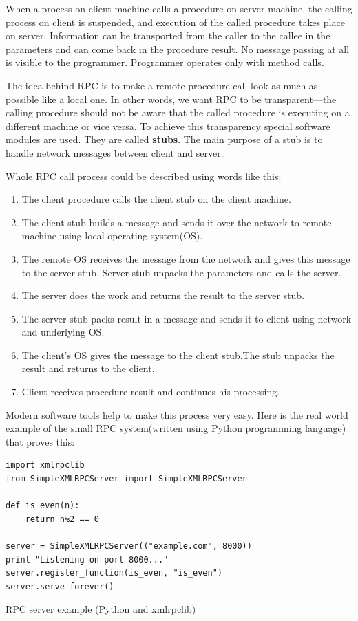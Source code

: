 When a process on client machine calls a
procedure on server machine, the calling process on client is suspended, and
execution of the called procedure takes place on server. Information can be
transported from the caller to the callee in the parameters and can come back in the procedure result.
No message passing at all is visible to the programmer. Programmer operates only
with method calls.

The idea behind RPC is to make a remote procedure call look as much as possible
like a local one. In other words, we want RPC to be transparent—the calling
procedure should not be aware that the called procedure is executing on a different
machine or vice versa\cite{tanenbaum07}. To achieve this transparency special
software modules are used. They are called \textbf{stubs}. The main purpose
of a stub is to handle network messages between client and server. 

Whole RPC call process could be described using words like this: 
\begin{enumerate}
\item The client procedure calls the client stub on the client machine.
\item The client stub builds a message and sends it over the network to remote
machine using local operating system(OS).
\item The remote  OS  receives the message from the network and gives
this message to the server stub. Server stub unpacks the parameters and calls
the server.
\item The server does the work and returns the result to the server stub.
\item The server stub packs result in a message and sends it to client using
network and underlying OS.
\item The client’s OS gives the message to the client stub.The stub unpacks the result and returns to the client.
\item Client receives procedure result and continues his processing.
\end{enumerate}

Modern software tools help to make this process very easy. Here
is the real world example of the small RPC system(written using Python
programming language) that proves this\cite{xmlrpclib_python_example}:

\begin{listing}[H]
\begin{verbatim}
import xmlrpclib
from SimpleXMLRPCServer import SimpleXMLRPCServer

def is_even(n):
    return n%2 == 0

server = SimpleXMLRPCServer(("example.com", 8000))
print "Listening on port 8000..."
server.register_function(is_even, "is_even")
server.serve_forever()
\end{verbatim}
\caption{RPC server example (Python and xmlrpclib)}
\label{lst:rpc_server_python_example}
\end{listing}

